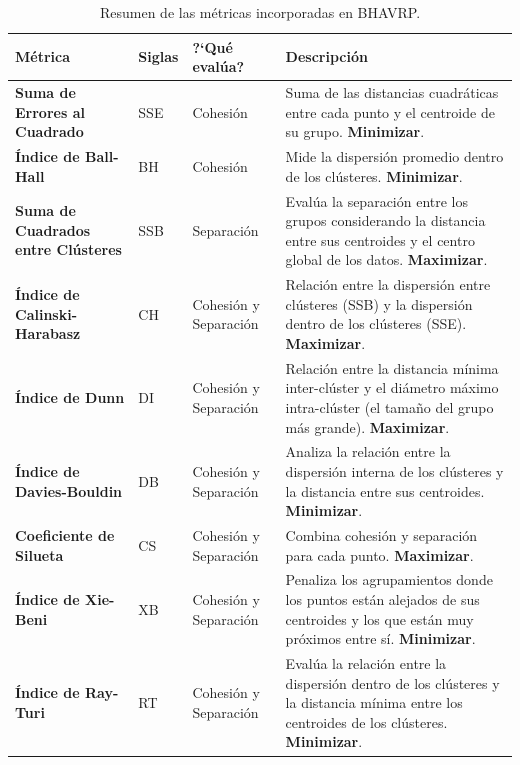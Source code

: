 \clearpage
\begin{landscape}
\begin{table}[htbp]
\centering
\caption{Resumen de las m\'etricas incorporadas en BHAVRP.}
\label{tab:metricas}
\small
\begin{tabular}{@{}lp{1.3cm}p{2cm}p{8.5cm}@{}}
\toprule
\textbf{M\'etrica} & \textbf{Siglas} & \textbf{?`Qu\'e eval\'ua?} & \textbf{Descripci\'on} \\
\midrule
\textbf{Suma de Errores al Cuadrado} & SSE & Cohesi\'on & Suma de las distancias cuadr\'aticas entre cada punto y el centroide de su grupo. \textbf{Minimizar}. \\
\textbf{\'Indice de Ball-Hall} & BH & Cohesi\'on & Mide la dispersi\'on promedio dentro de los cl\'usteres. \textbf{Minimizar}. \\
\textbf{Suma de Cuadrados entre Cl\'usteres} & SSB & Separaci\'on & Eval\'ua la separaci\'on entre los grupos considerando la distancia entre sus centroides y el centro global de los datos. \textbf{Maximizar}. \\
\textbf{\'Indice de Calinski-Harabasz} & CH & Cohesi\'on y Separaci\'on & Relaci\'on entre la dispersi\'on entre cl\'usteres (SSB) y la dispersi\'on dentro de los cl\'usteres (SSE). \textbf{Maximizar}. \\
\textbf{\'Indice de Dunn} & DI & Cohesi\'on y Separaci\'on & Relaci\'on entre la distancia m\'inima inter-cl\'uster y el di\'ametro m\'aximo intra-cl\'uster (el tama\~no del grupo m\'as grande). \textbf{Maximizar}. \\
\textbf{\'Indice de Davies-Bouldin} & DB & Cohesi\'on y Separaci\'on & Analiza la relaci\'on entre la dispersi\'on interna de los cl\'usteres y la distancia entre sus centroides. \textbf{Minimizar}. \\
\textbf{Coeficiente de Silueta} & CS & Cohesi\'on y Separaci\'on & Combina cohesi\'on y separaci\'on para cada punto. \textbf{Maximizar}. \\
\textbf{\'Indice de Xie-Beni} & XB & Cohesi\'on y Separaci\'on & Penaliza los agrupamientos donde los puntos est\'an alejados de sus centroides y los que est\'an muy pr\'oximos entre s\'i. \textbf{Minimizar}. \\
\textbf{\'Indice de Ray-Turi} & RT & Cohesi\'on y Separaci\'on & Eval\'ua la relaci\'on entre la dispersi\'on dentro de los cl\'usteres y la distancia m\'inima entre los centroides de los cl\'usteres. \textbf{Minimizar}. \\
\bottomrule
\end{tabular}
\end{table}
\end{landscape}
\clearpage

